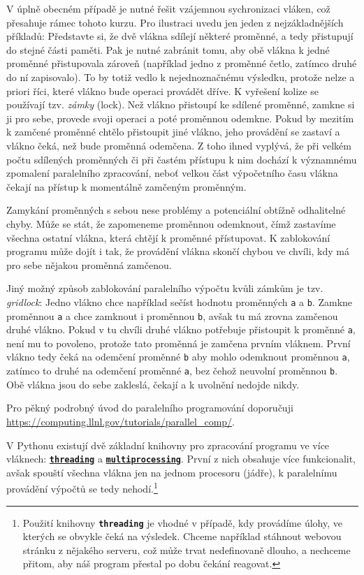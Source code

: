 \documentclass[a4paper,11pt,twoside]{article}
\def\code#1{\textnormal{\texttt{#1}}}
\def\file#1{\textnormal{\textbf{\texttt{#1}}}}
\theoremstyle{red}
\theoremstyle{green}
\begin{document}
    V úplně obecném případě je nutné řešit vzájemnou sychronizaci vláken, což přesahuje rámec tohoto kurzu. 
    Pro ilustraci uvedu jen jeden z nejzákladnějších příkladů: 
    Představte si, že dvě vlákna sdílejí některé proměnné, a tedy přistupují do stejné části paměti. 
    Pak je nutné zabránit tomu, aby obě vlákna k jedné proměnné přistupovala zároveň (například jedno z proměnné četlo, zatímco druhé do ní zapisovalo).
    To by totiž vedlo k nejednoznačnému výsledku, protože nelze a priori říci, které vlákno bude operaci provádět dříve. 
    K vyřešení kolize se používají tzv. \emph{zámky} (lock).
    Než vlákno přistoupí ke sdílené proměnné, zamkne si ji pro sebe, provede svoji operaci a poté proměnnou odemkne.
    Pokud by mezitím k zamčené proměnné chtělo přistoupit jiné vlákno, jeho provádění se zastaví a vlákno čeká, než bude proměnná odemčena.
    Z toho ihned vyplývá, že při velkém počtu sdílených proměnných či při častém přístupu k nim dochází k významnému zpomalení paralelního zpracování, neboť velkou část výpočetního času vlákna čekají na přístup k momentálně zamčeným proměnným.

    Zamykání proměnných s sebou nese problémy a potenciální obtížně odhalitelné chyby.
    Může se stát, že zapomeneme proměnnou odemknout, čímž zastavíme všechna ostatní vlákna, která chtějí k proměnné přístupovat.
    K zablokování programu může dojít i tak, že provádění vlákna skončí chybou ve chvíli, kdy má pro sebe nějakou proměnná zamčenou. 

    Jiný možný způsob zablokování paralelního výpočtu kvůli zámkům je tzv. \emph{gridlock}: Jedno vlákno chce například sečíst hodnotu proměnných \code{a} a \code{b}.
    Zamkne proměnnou \code{a} a chce zamknout i proměnnou \code{b}, avšak tu má zrovna zamčenou druhé vlákno.
    Pokud v tu chvíli druhé vlákno potřebuje přistoupit k proměnné \code{a}, není mu to povoleno, protože tato proměnná je zamčena prvním vláknem.
    První vlákno tedy čeká na odemčení proměnné \code{b} aby mohlo odemknout proměnnou \code{a}, zatímco to druhé na odemčení proměnné \code{a}, bez čehož neuvolní proměnnou \code{b}. 
    Obě vlákna jsou do sebe zakleslá, čekají a k uvolnění nedojde nikdy.    

    Pro pěkný podrobný úvod do paralelního programování doporučuji \url{https://computing.llnl.gov/tutorials/parallel_comp/}.

    V Pythonu existují dvě základní knihovny pro zpracování programu ve více vláknech: \file{\href{https://docs.python.org/3/library/threading.html}{threading}} a \file{\href{https://docs.python.org/3/library/multiprocessing.html}{multiprocessing}}.
    První z nich obsahuje více funkcionalit, avšak spouští všechna vlákna jen na jednom procesoru (jádře), k paralelnímu provádění výpočtů se tedy nehodí.\footnote{
        Použití knihovny \file{threading} je vhodné v případě, kdy provádíme úlohy, ve kterých se obvykle čeká na výsledek.
        Chceme například stáhnout webovou stránku z nějakého serveru, což může trvat nedefinovaně dlouho, a nechceme přitom, aby náš program přestal po dobu čekání reagovat.
    }
\end{document}
